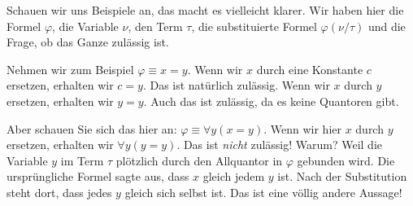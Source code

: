 \begin{math-stroke}
\end{math-stroke}

\begin{spoken-clean}[01:19:27 - 01:22:27]
Schauen wir uns Beispiele an, das macht es vielleicht klarer.  Wir haben hier die Formel $\varphi$, die Variable $\nu$, den Term $\tau$, die substituierte Formel $\varphi(\nu/\tau)$ und die Frage, ob das Ganze zulässig ist.

Nehmen wir zum Beispiel $\varphi \equiv x = y$. Wenn wir $x$ durch eine Konstante $c$ ersetzen, erhalten wir $c = y$. Das ist natürlich zulässig. Wenn wir $x$ durch $y$ ersetzen, erhalten wir $y = y$. Auch das ist zulässig, da es keine Quantoren gibt.

Aber schauen Sie sich das hier an: $\varphi \equiv \forall y (x = y)$. Wenn wir hier $x$ durch $y$ ersetzen, erhalten wir $\forall y (y = y)$. Das ist \emph{nicht} zulässig! Warum? Weil die Variable $y$ im Term $\tau$ plötzlich durch den Allquantor in $\varphi$ gebunden wird. Die ursprüngliche Formel sagte aus, dass $x$ gleich jedem $y$ ist. Nach der Substitution steht dort, dass jedes $y$ gleich sich selbst ist. Das ist eine völlig andere Aussage!
\end{spoken-clean}

